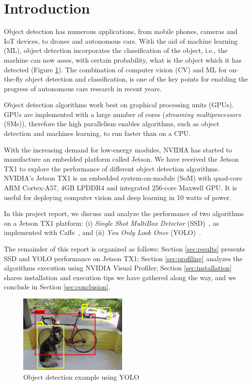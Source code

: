\section{Introduction}
\label{sec:intro}

Object detection has numerous applications, from mobile phones, cameras and IoT devices, to drones and autonomous cars. With the aid of machine learning (ML), object detection incorporates the classification of the object, i.e., the machine can now asses, with certain probability, what is the object which it has detected (Figure \ref{fig:detection_example}). The combination of computer vision (CV) and ML for on-the-fly object detection and classification, is one of the key points
for enabling the progress of autonomous cars research in recent years.

Object detection algorithms work best on graphical processing units (GPUs). GPUs are implemented with a large number of cores (\textit{streaming multiprocessors} (SMs)), therefore the high parallelism enables algorithms, such as object detection and machines learning, to run faster than on a CPU.

With the increasing demand for low-energy modules, NVIDIA has started to manufacture an embedded platform called Jetson. We have received the Jetson TX1 to explore the performance of different object detection algorithms. NVIDIA's Jetson TX1 is an embedded system-on-module (SoM) with quad-core ARM Cortex-A57, 4GB LPDDR4 and integrated 256-core Maxwell GPU. It is useful for deploying computer vision and deep learning in 10 watts of power.

In this project report, we discuss and analyze the performance of two algorithms on a Jetson TX1 platform: (i) \textit{Single Shot MultiBox Detector} (SSD)~\cite{liu2016ssd}, as implemented with Caffe~\cite{caffeoriginal}, and (ii) \textit{You Only Look Once} (YOLO)~\cite{redmon2016you}.

The remainder of this report is organized as follows: Section \ref{sec:results} presents SSD and YOLO performance on Jetson TX1; Section \ref{sec:profiling} analyzes the algorithms execution using NVIDIA Visual Profiler; Section \ref{sec:installation} shares installation and execution tips we have gathered along the way, and we conclude in Section \ref{sec:conclusion}.

\begin{figure}[t]
	\includegraphics[width=0.48\textwidth]{./imgs/detection_example.png}
	\caption{Object detection example using YOLO}
	\label{fig:detection_example}
\end{figure}
